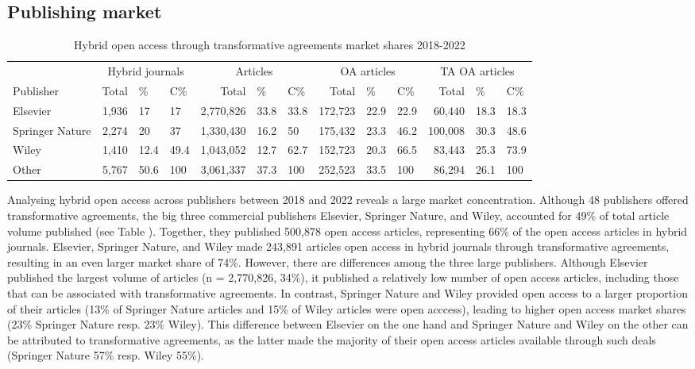 \documentclass[a4paper,man,floatsintext,longtable,noextraspace,12pt]{apa6}
\begin{document}
\hypertarget{publishing-market}{%
\subsection{Publishing market}\label{publishing-market}}

\begin{table}[H]

\caption{\label{tab:unnamed-chunk-5}Hybrid open access through transformative agreements market shares 2018-2022}
\centering
\fontsize{10}{12}\selectfont
\begin{tabular}[t]{lrllrllrllrll}
\toprule
\multicolumn{1}{c}{ } & \multicolumn{3}{c}{Hybrid journals} & \multicolumn{3}{c}{Articles} & \multicolumn{3}{c}{OA articles} & \multicolumn{3}{c}{TA OA articles} \\
\cmidrule(l{3pt}r{3pt}){2-4} \cmidrule(l{3pt}r{3pt}){5-7} \cmidrule(l{3pt}r{3pt}){8-10} \cmidrule(l{3pt}r{3pt}){11-13}
Publisher & Total & \% & C\% & Total & \% & C\% & Total & \% & C\% & Total & \% & C\%\\
\midrule
Elsevier & 1,936 & 17 & 17 & 2,770,826 & 33.8 & 33.8 & 172,723 & 22.9 & 22.9 & 60,440 & 18.3 & 18.3\\
Springer Nature & 2,274 & 20 & 37 & 1,330,430 & 16.2 & 50 & 175,432 & 23.3 & 46.2 & 100,008 & 30.3 & 48.6\\
Wiley & 1,410 & 12.4 & 49.4 & 1,043,052 & 12.7 & 62.7 & 152,723 & 20.3 & 66.5 & 83,443 & 25.3 & 73.9\\
Other & 5,767 & 50.6 & 100 & 3,061,337 & 37.3 & 100 & 252,523 & 33.5 & 100 & 86,294 & 26.1 & 100\\
\bottomrule
\end{tabular}
\end{table}

Analysing hybrid open access across publishers between 2018 and 2022
reveals a large market concentration. Although 48 publishers offered
transformative agreements, the big three commercial publishers Elsevier,
Springer Nature, and Wiley, accounted for 49\% of total article volume
published (see Table ). Together, they published 500,878 open access
articles, representing 66\% of the open access articles in hybrid
journals. Elsevier, Springer Nature, and Wiley made 243,891 articles
open access in hybrid journals through transformative agreements,
resulting in an even larger market share of 74\%. However, there are
differences among the three large publishers. Although Elsevier
published the largest volume of articles (n = 2,770,826, 34\%), it
published a relatively low number of open access articles, including
those that can be associated with transformative agreements. In
contrast, Springer Nature and Wiley provided open access to a larger
proportion of their articles (13\% of Springer Nature articles and 15\%
of Wiley articles were open acccess), leading to higher open access
market shares (23\% Springer Nature resp. 23\% Wiley). This difference
between Elsevier on the one hand and Springer Nature and Wiley on the
other can be attributed to transformative agreements, as the latter made
the majority of their open access articles available through such deals
(Springer Nature 57\% resp. Wiley 55\%).
\end{document}

